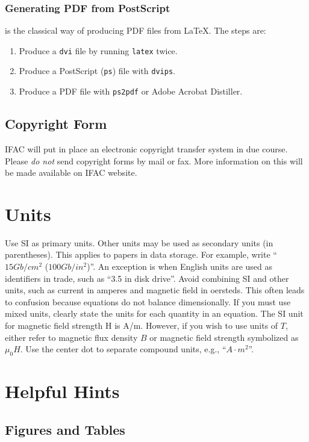 \documentclass{ifacconf}
\begin{document}
\subsubsection{Generating PDF from PostScript} is the classical way of
producing PDF files from LaTeX. The steps are:

\begin{enumerate}
  \item Produce a \texttt{dvi} file by running \texttt{latex} twice.
  \item Produce a PostScript (\texttt{ps}) file with \texttt{dvips}.
  \item Produce a PDF file with \texttt{ps2pdf} or Adobe Acrobat
  Distiller.
\end{enumerate}

\subsection{Copyright Form}

IFAC will put in place an electronic copyright transfer system in due
course. Please \emph{do not} send copyright forms by mail or fax. More
information on this will be made available on IFAC website.


\section{Units}

Use SI as primary units. Other units may be used as secondary units
(in parentheses). This applies to papers in data storage. For example,
write ``$15 Gb/cm^2$ ($100 Gb/in^2$)''. An exception is when
English units are used as identifiers in trade, such as ``3.5 in
disk drive''. Avoid combining SI and other units, such as current in
amperes and magnetic field in oersteds. This often leads to confusion
because equations do not balance dimensionally. If you must use mixed
units, clearly state the units for each quantity in an equation.  The
SI unit for magnetic field strength H is A/m. However, if you wish to
use units of $T$, either refer to magnetic flux density $B$ or
magnetic field strength symbolized as $\mu_0 H$. Use the center dot to
separate compound units, e.g., ``$A\cdot m^2$''.

\section{Helpful Hints}

\subsection{Figures and Tables}
\end{document}
